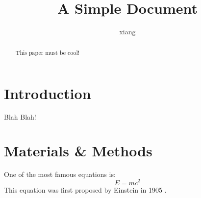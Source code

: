 \documentclass[12pt]{article}
\title{A Simple Document}
\author{xiang}
\date{}
\begin{document}
  \maketitle
  
  \begin{abstract}
    This paper must be cool!
  \end{abstract}

  \section{Introduction}
    Blah Blah!

  \section{Materials \& Methods}
  One of the most famous equations is:
  \begin{equation}
    E = mc^2
  \end{equation}
  This equation was first proposed by Einstein in 1905 
  \cite{einstein1905does}.

  
  
\end{document}
